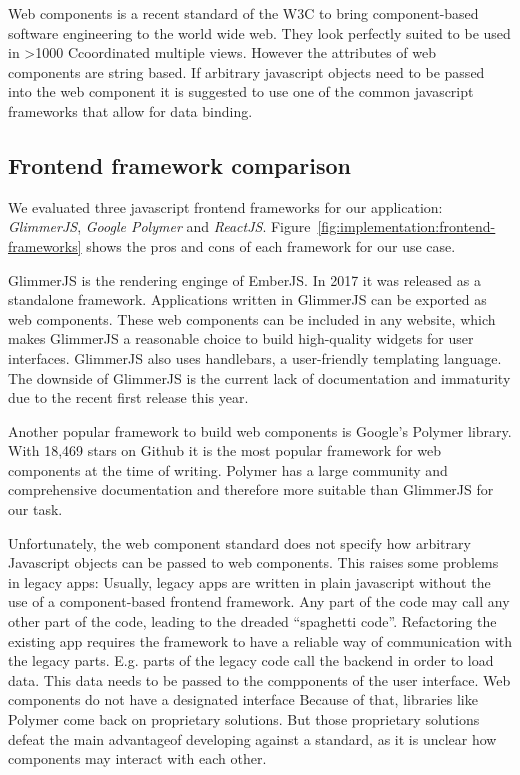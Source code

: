 \documentclass{article}
\newcommand\hmm[1]{\ifnum\ifhmode\spacefactor\else2000\fi>1000 \uppercase{#1}\else#1\fi}
\newcommand{\cmvs}{\hmm{c}oordinated multiple views}
\begin{document}
Web components is a recent standard of the W3C\cite{W3C2017} to bring component-based software engineering to the world wide web.
They look perfectly suited to be used in \cmvs{}.
However the attributes of web components are string based.
If arbitrary javascript objects need to be passed into the web component it is suggested to use one of the common javascript frameworks that allow for data binding.

\subsection{Frontend framework comparison}

We evaluated three javascript frontend frameworks for our application: \emph{GlimmerJS}, \emph{Google Polymer} and \emph{ReactJS}.
Figure~\ref{fig:implementation:frontend-frameworks} shows the pros and cons of each framework for our use case.

GlimmerJS is the rendering enginge of EmberJS\cite{Ember2017}.
In 2017 it was released as a standalone framework.
Applications written in GlimmerJS can be exported as web components.
These web components can be included in any website, which makes GlimmerJS a reasonable choice to build high-quality widgets for user interfaces.
GlimmerJS also uses handlebars\cite{Handlebars2017}, a user-friendly templating language.
The downside of GlimmerJS is the current lack of documentation and immaturity due to the recent first release this year.

Another popular framework to build web components is Google's Polymer library\cite{Polymer2017}.
With 18,469 stars on Github it is the most popular framework for web components at the time of writing.
Polymer has a large community and comprehensive documentation and therefore more suitable than GlimmerJS for our task.

Unfortunately, the web component standard does not specify how arbitrary Javascript objects can be passed to web components.
This raises some problems in legacy apps:
Usually, legacy apps are written in plain javascript without the use of a component-based frontend framework.
Any part of the code may call any other part of the code, leading to the dreaded ``spaghetti code''.
Refactoring the existing app requires the framework to have a reliable way of communication with the legacy parts.
E.g. parts of the legacy code call the backend in order to load data.
This data needs to be passed to the compponents of the user interface.
Web components do not have a designated interface
Because of that, libraries like Polymer come back on proprietary solutions.
But those proprietary solutions defeat the main advantageof developing against a standard, as it is unclear how components may interact with each other.
\end{document}
